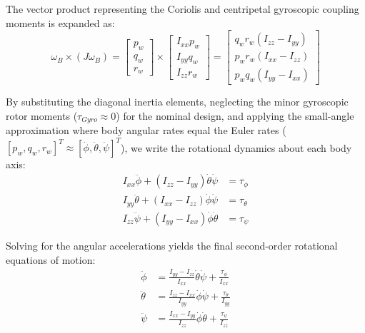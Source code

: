 The vector product representing the Coriolis and centripetal gyroscopic coupling moments is expanded as:
\begin{equation}
\omega_B \times (J \omega_B) = \begin{bmatrix} p_w \\ q_w \\ r_w \end{bmatrix} \times \begin{bmatrix} I_{xx} p_w \\ I_{yy} q_w \\ I_{zz} r_w \end{bmatrix} = \begin{bmatrix} q_w r_w (I_{zz} - I_{yy}) \\ p_w r_w (I_{xx} - I_{zz}) \\ p_w q_w (I_{yy} - I_{xx}) \end{bmatrix}
\end{equation}

By substituting the diagonal inertia elements, neglecting the minor gyroscopic rotor moments ($\tau_{Gyro} \approx 0$) for the nominal design, and applying the small-angle approximation where body angular rates equal the Euler rates ($[p_w, q_w, r_w]^T \approx [\dot{\phi}, \dot{\theta}, \dot{\psi}]^T$), we write the rotational dynamics about each body axis:
\begin{align}
I_{xx} \ddot{\phi} + (I_{zz} - I_{yy})\dot{\theta}\dot{\psi} &= \tau_{\phi} \\
I_{yy} \ddot{\theta} + (I_{xx} - I_{zz})\dot{\phi}\dot{\psi} &= \tau_{\theta} \\
I_{zz} \ddot{\psi} + (I_{yy} - I_{xx})\dot{\phi}\dot{\theta} &= \tau_{\psi}
\end{align}

Solving for the angular accelerations yields the final second-order rotational equations of motion:
\begin{align}
\ddot{\phi} &= \frac{I_{yy} - I_{zz}}{I_{xx}}\dot{\theta}\dot{\psi} + \frac{\tau_{\phi}}{I_{xx}} \\
\ddot{\theta} &= \frac{I_{zz} - I_{xx}}{I_{yy}}\dot{\phi}\dot{\psi} + \frac{\tau_{\theta}}{I_{yy}} \\
\ddot{\psi} &= \frac{I_{xx} - I_{yy}}{I_{zz}}\dot{\phi}\dot{\theta} + \frac{\tau_{\psi}}{I_{zz}}
\end{align}

